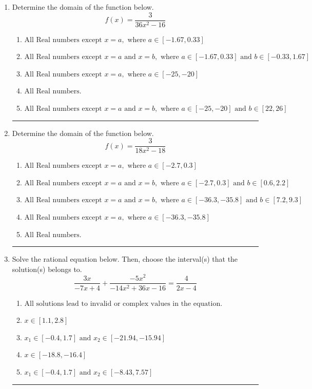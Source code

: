 \documentclass[14pt]{extbook}
\newcommand{\litem}[1]{\item#1\hspace*{-1cm}\rule{\textwidth}{0.4pt}}
\begin{document}
\begin{enumerate}
\litem{
Determine the domain of the function below.\[ f(x) = \frac{3}{36x^{2} -16} \]\begin{enumerate}[label=\Alph*.]
\item \( \text{All Real numbers except } x = a, \text{ where } a \in [-1.67, 0.33] \)
\item \( \text{All Real numbers except } x = a \text{ and } x = b, \text{ where } a \in [-1.67, 0.33] \text{ and } b \in [-0.33, 1.67] \)
\item \( \text{All Real numbers except } x = a, \text{ where } a \in [-25, -20] \)
\item \( \text{All Real numbers.} \)
\item \( \text{All Real numbers except } x = a \text{ and } x = b, \text{ where } a \in [-25, -20] \text{ and } b \in [22, 26] \)

\end{enumerate} }
\litem{
Determine the domain of the function below.\[ f(x) = \frac{3}{18x^{2} -18} \]\begin{enumerate}[label=\Alph*.]
\item \( \text{All Real numbers except } x = a, \text{ where } a \in [-2.7, 0.3] \)
\item \( \text{All Real numbers except } x = a \text{ and } x = b, \text{ where } a \in [-2.7, 0.3] \text{ and } b \in [0.6, 2.2] \)
\item \( \text{All Real numbers except } x = a \text{ and } x = b, \text{ where } a \in [-36.3, -35.8] \text{ and } b \in [7.2, 9.3] \)
\item \( \text{All Real numbers except } x = a, \text{ where } a \in [-36.3, -35.8] \)
\item \( \text{All Real numbers.} \)

\end{enumerate} }
\litem{
Solve the rational equation below. Then, choose the interval(s) that the solution(s) belongs to.\[ \frac{3x}{-7x + 4} + \frac{-5x^{2}}{-14x^{2} +36 x -16} = \frac{4}{2x -4} \]\begin{enumerate}[label=\Alph*.]
\item \( \text{All solutions lead to invalid or complex values in the equation.} \)
\item \( x \in [1.1,2.8] \)
\item \( x_1 \in [-0.4, 1.7] \text{ and } x_2 \in [-21.94,-15.94] \)
\item \( x \in [-18.8,-16.4] \)
\item \( x_1 \in [-0.4, 1.7] \text{ and } x_2 \in [-8.43,7.57] \)


\end{enumerate}}
\end{enumerate}
\end{document}
